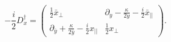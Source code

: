 \begin{equation}
-\frac{i}{2}D_x^\dagger
=\left(\begin{array}{cc}
\frac{1}{2}\bar x_\perp&
\partial_y-\frac{\kappa}{2y}-\frac{i}{2}\bar x_{||}\\
\partial_{\bar y}+\frac{\kappa}{2\bar y}-\frac{i}{2}x_{||}&
\frac{1}{2}x_\perp
\end{array}\right).
\end{equation}

